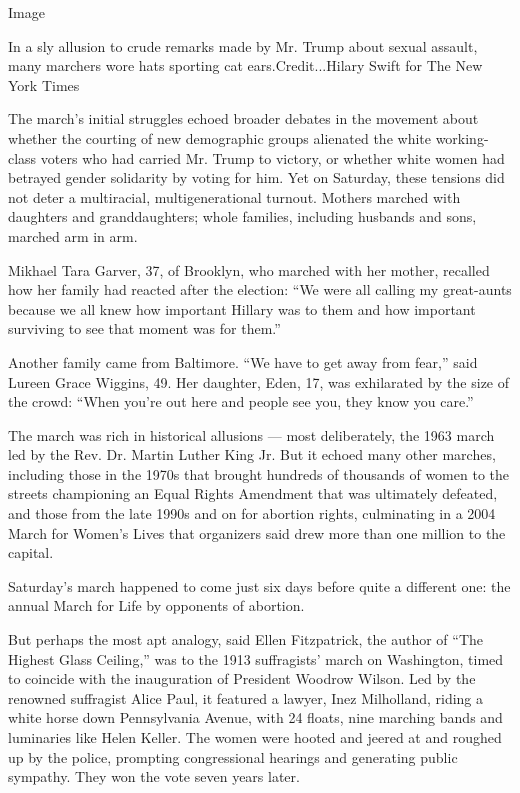 Image

In a sly allusion to crude remarks made by Mr. Trump about sexual
assault, many marchers wore hats sporting cat ears.Credit...Hilary Swift
for The New York Times

The march's initial struggles echoed broader debates in the movement
about whether the courting of new demographic groups alienated the white
working-class voters who had carried Mr. Trump to victory, or whether
white women had betrayed gender solidarity by voting for him. Yet on
Saturday, these tensions did not deter a multiracial, multigenerational
turnout. Mothers marched with daughters and granddaughters; whole
families, including husbands and sons, marched arm in arm.

Mikhael Tara Garver, 37, of Brooklyn, who marched with her mother,
recalled how her family had reacted after the election: ``We were all
calling my great-aunts because we all knew how important Hillary was to
them and how important surviving to see that moment was for them.''

Another family came from Baltimore. ``We have to get away from fear,''
said Lureen Grace Wiggins, 49. Her daughter, Eden, 17, was exhilarated
by the size of the crowd: ``When you're out here and people see you,
they know you care.''

The march was rich in historical allusions --- most deliberately, the
1963 march led by the Rev. Dr. Martin Luther King Jr. But it echoed many
other marches, including those in the 1970s that brought hundreds of
thousands of women to the streets championing an Equal Rights Amendment
that was ultimately defeated, and those from the late 1990s and on for
abortion rights, culminating in a 2004 March for Women's Lives that
organizers said drew more than one million to the capital.

Saturday's march happened to come just six days before quite a different
one: the annual March for Life by opponents of abortion.

But perhaps the most apt analogy, said Ellen Fitzpatrick, the author of
``The Highest Glass Ceiling,'' was to the 1913 suffragists' march on
Washington, timed to coincide with the inauguration of President Woodrow
Wilson. Led by the renowned suffragist Alice Paul, it featured a lawyer,
Inez Milholland, riding a white horse down Pennsylvania Avenue, with 24
floats, nine marching bands and luminaries like Helen Keller. The women
were hooted and jeered at and roughed up by the police, prompting
congressional hearings and generating public sympathy. They won the vote
seven years later.

